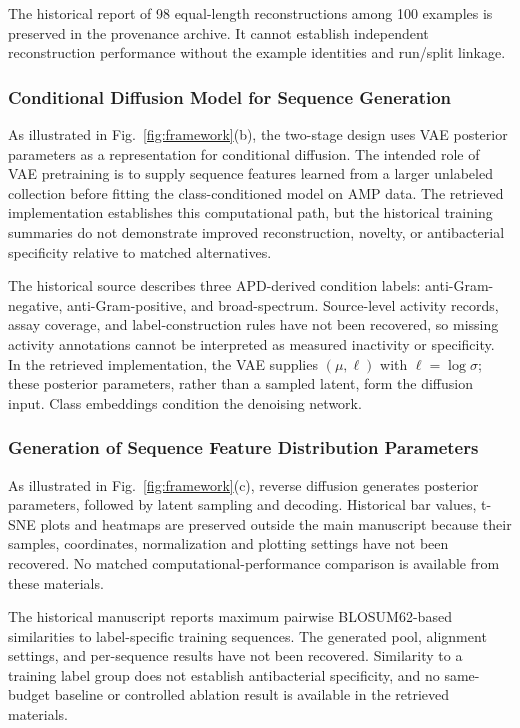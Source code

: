 \documentclass[journal]{IEEEtran}
\begin{document}
The historical report of 98 equal-length reconstructions among 100 examples is preserved in the provenance archive. It cannot establish independent reconstruction performance without the example identities and run/split linkage.



\subsubsection{Conditional Diffusion Model for Sequence Generation}

As illustrated in Fig.~\ref{fig:framework}(b), the two-stage design uses VAE posterior parameters as a representation for conditional diffusion. The intended role of VAE pretraining is to supply sequence features learned from a larger unlabeled collection before fitting the class-conditioned model on AMP data. The retrieved implementation establishes this computational path, but the historical training summaries do not demonstrate improved reconstruction, novelty, or antibacterial specificity relative to matched alternatives.

The historical source describes three APD-derived condition labels: anti-Gram-negative, anti-Gram-positive, and broad-spectrum. Source-level activity records, assay coverage, and label-construction rules have not been recovered, so missing activity annotations cannot be interpreted as measured inactivity or specificity. In the retrieved implementation, the VAE supplies $(\mu,\ell)$ with $\ell=\log\sigma$; these posterior parameters, rather than a sampled latent, form the diffusion input. Class embeddings condition the denoising network.

\subsubsection{Generation of Sequence Feature Distribution Parameters}

As illustrated in Fig.~\ref{fig:framework}(c), reverse diffusion generates posterior parameters, followed by latent sampling and decoding. Historical bar values, t-SNE plots and heatmaps are preserved outside the main manuscript because their samples, coordinates, normalization and plotting settings have not been recovered. No matched computational-performance comparison is available from these materials.



The historical manuscript reports maximum pairwise BLOSUM62-based similarities to label-specific training sequences. The generated pool, alignment settings, and per-sequence results have not been recovered. Similarity to a training label group does not establish antibacterial specificity, and no same-budget baseline or controlled ablation result is available in the retrieved materials.
\end{document}
